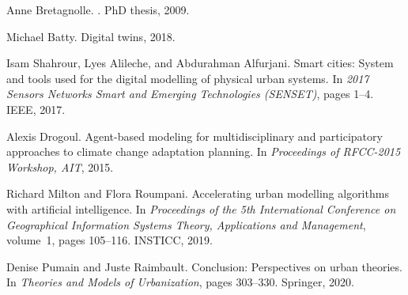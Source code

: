 \begin{thebibliography}{10}
Anne Bretagnolle.
.
\newblock PhD thesis, 2009.

Michael Batty.
\newblock Digital twins, 2018.

Isam Shahrour, Lyes Alileche, and Abdurahman Alfurjani.
\newblock Smart cities: System and tools used for the digital modelling of
  physical urban systems.
\newblock In {\em 2017 Sensors Networks Smart and Emerging Technologies
  (SENSET)}, pages 1--4. IEEE, 2017.

Alexis Drogoul.
\newblock Agent-based modeling for multidisciplinary and participatory
  approaches to climate change adaptation planning.
\newblock In {\em Proceedings of RFCC-2015 Workshop, AIT}, 2015.

Richard Milton and Flora Roumpani.
\newblock Accelerating urban modelling algorithms with artificial intelligence.
\newblock In {\em Proceedings of the 5th International Conference on
  Geographical Information Systems Theory, Applications and Management},
  volume~1, pages 105--116. INSTICC, 2019.

Denise Pumain and Juste Raimbault.
\newblock Conclusion: Perspectives on urban theories.
\newblock In {\em Theories and Models of Urbanization}, pages 303--330.
  Springer, 2020.

\end{thebibliography}






